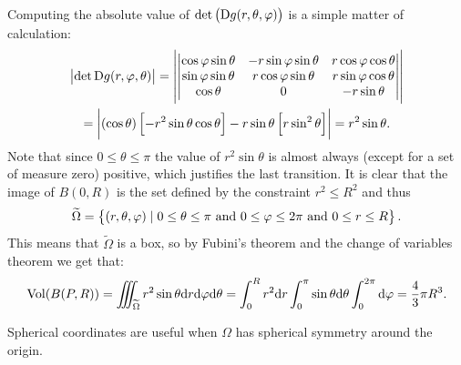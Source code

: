 \documentclass[11pt,a4paper]{article}
\begin{document}
\begin{example}
  Computing the absolute value of $\det\del{\Dif g(r,\theta,\varphi)}$
  is a simple matter of calculation:
  \begin{multline*}
    \abs{\det{\Dif g(r,\varphi,\theta)}} =
    \abs{\begin{vmatrix}
      \cos \varphi \sin \theta & -r \sin \varphi \sin \theta & r \cos \varphi \cos \theta \\
      \sin \varphi \sin \theta & r \cos \varphi \sin \theta & r \sin \varphi \cos \theta  \\
      \cos \theta & 0 & -r \sin \theta
    \end{vmatrix}} \\ =
    \abs{\del{\cos \theta} \left[-r^2 \sin \theta \cos \theta\right] -
    r \sin \theta \left[r \sin^2 \theta\right]} =
    r^2 \sin \theta.
  \end{multline*}
  Note that since $0 \le \theta \le \pi$ the value of $r^2 \sin \theta$
  is almost always (except for a set of measure zero) positive,
  which justifies the last transition.
  It is clear that the image of $B(0,R)$ is the set defined by the
  constraint $r^2 \le R^2$ and thus
  \[
    \widetilde \Omega =
    \left\{(r,\theta,\varphi) \mid
    0 \le \theta \le \pi \text{ and } 0 \le \varphi \le 2\pi \text{ and } 0 \le r \le R\right\}.
  \]
  This means that $\widetilde \Omega$ is a box,
  so by Fubini's theorem and the change of variables theorem we get that:
  \[
    \operatorname{Vol}(B(P,R)) =
    \iiint_{\widetilde \Omega} r^2 \sin \theta \mathrm{d} r \mathrm{d} \varphi \mathrm{d}\theta =
    \int_{0}^{R} r^2 \mathrm{d} r
    \int_{0}^{\pi} \sin \theta \mathrm{d}\theta
    \int_{0}^{2\pi} \mathrm{d} \varphi =
    \frac{4}{3} \pi R^3.
  \]
\end{example}
\begin{remark}
  Spherical coordinates are useful when $\Omega$ has spherical symmetry
  around the origin.
\end{remark}
\end{document}
